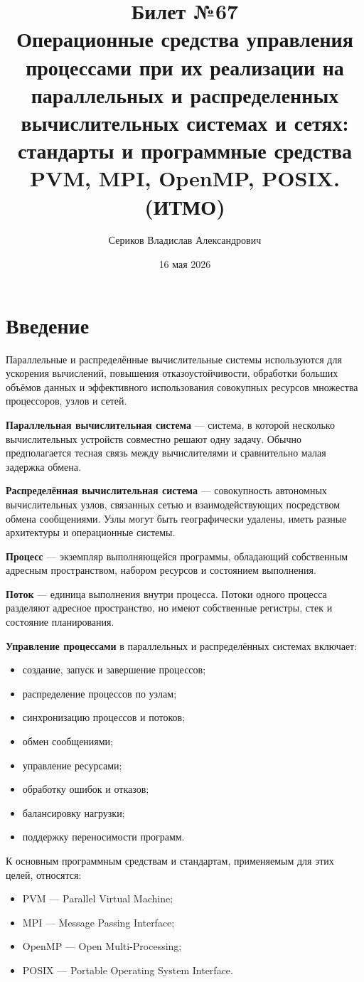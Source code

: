 \documentclass[12pt,a4paper]{article}
\title{Билет №67 \\ \small Операционные средства управления процессами при их реализации на параллельных и распределенных вычислительных системах и сетях: стандарты и программные средства PVM, MPI, OpenMP, POSIX. (ИТМО)}
\author{Сериков Владислав Александрович}
\date{16 мая 2026}
\begin{document}
\maketitle
\tableofcontents
\newpage

\section{Введение}

Параллельные и распределённые вычислительные системы используются для ускорения вычислений, повышения отказоустойчивости, обработки больших объёмов данных и эффективного использования совокупных ресурсов множества процессоров, узлов и сетей.

\textbf{Параллельная вычислительная система} --- система, в которой несколько вычислительных устройств совместно решают одну задачу. Обычно предполагается тесная связь между вычислителями и сравнительно малая задержка обмена.

\textbf{Распределённая вычислительная система} --- совокупность автономных вычислительных узлов, связанных сетью и взаимодействующих посредством обмена сообщениями. Узлы могут быть географически удалены, иметь разные архитектуры и операционные системы.

\textbf{Процесс} --- экземпляр выполняющейся программы, обладающий собственным адресным пространством, набором ресурсов и состоянием выполнения.

\textbf{Поток} --- единица выполнения внутри процесса. Потоки одного процесса разделяют адресное пространство, но имеют собственные регистры, стек и состояние планирования.

\textbf{Управление процессами} в параллельных и распределённых системах включает:
\begin{itemize}
    \item создание, запуск и завершение процессов;
    \item распределение процессов по узлам;
    \item синхронизацию процессов и потоков;
    \item обмен сообщениями;
    \item управление ресурсами;
    \item обработку ошибок и отказов;
    \item балансировку нагрузки;
    \item поддержку переносимости программ.
\end{itemize}

К основным программным средствам и стандартам, применяемым для этих целей, относятся:
\begin{itemize}
    \item PVM --- Parallel Virtual Machine;
    \item MPI --- Message Passing Interface;
    \item OpenMP --- Open Multi-Processing;
    \item POSIX --- Portable Operating System Interface.
\end{itemize}
\end{document}
